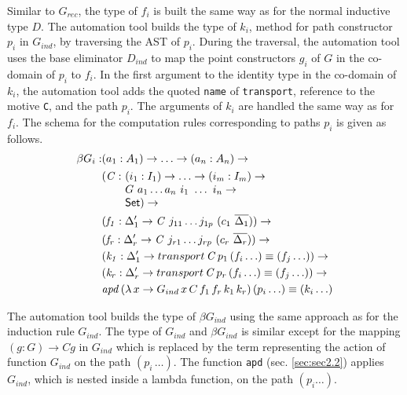 \documentclass[sigplan,10pt]{acmart}
\begin{document}
Similar to $G_{rec}$, the type of $f_i$ is built the same way as for the normal inductive type $D$. The automation tool builds the type of $k_i$, method for path constructor $p_i$ in $G_{ind}$, by traversing the AST of $p_i$. During the traversal, the automation tool uses the base eliminator $D_{ind}$ to map the point constructors $g_i$ of $G$ in the co-domain of $p_i$ to $f_i$. In the first argument to the identity type in the co-domain of $k_i$, the automation tool adds the quoted {\tt name} of {\tt transport}, reference to the motive {\tt C}, and the path $p_i$. The arguments of $k_i$ are handled the same way as for $f_i$. The schema for the computation rules corresponding to paths $p_i$ is given as follows.
\begin{align*}
\beta G_i : & (a_1 : A_1) \to \ldots \to (a_n : A_n) \to\\
& \begin{array}{@{}l@{}l}(\mathit{C} :\ & (i_1 : I_1) \to \ldots \to (i_m : I_m) \to\\  & G\ a_1 \ldots a_n\ i_1\ \ldots\ i_n \to\\ &\SET{})\to\end{array} \\
& (\mathit{f_1} : \Delta_1^\prime \to \mathit{C}\ j_{11} \ldots j_{1p}\ (c_1\ \overline{\Delta_1})) \to \\
& (\mathit{f_r} : \Delta_r^\prime \to \mathit{C}\ j_{r1} \ldots j_{rp}\ (c_r\ \overline{\Delta_r})) \to \\
& (\mathit{k_1} : \Delta_1^\prime \to transport \, \mathit{C} \, p_1 \, (f_i \ldots) \equiv (f_j \ldots)) \to \\
& (\mathit{k_r} : \Delta_r^\prime \to transport \, \mathit{C} \, p_r \, (f_i \ldots) \equiv (f_j \ldots)) \to \\
& \mathit{apd} \, (\lambda \, x \to G_{ind} \, x \, C \, f_1 \, f_r \, k_1 \, k_r) \, (p_i \ldots) \equiv (k_i \ldots)
\end{align*}

The automation tool builds the type of $\beta G_{ind}$ using the same approach as for the induction rule $G_{ind}$. The type of $G_{ind}$ and $\beta G_{ind}$ is similar except for the mapping $(g : G) \to C g$ in $G_{ind}$ which is replaced by the term representing the action of function $G_{ind}$ on the path $(p_i \, \ldots)$. The function {\tt apd} (sec. \ref{sec:sec2.2}) applies $G_{ind}$, which is nested inside a lambda function, on the path $(p_i \ldots)$.
\end{document}
